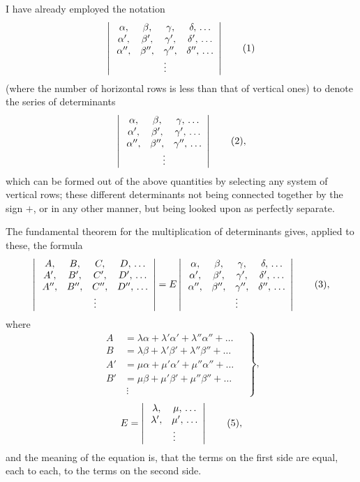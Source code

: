 \documentclass[11pt]{article}
\begin{document}
I have already employed the notation
\[
\left|\,
\begin{array}{cccc}
\alpha, & \beta, & \gamma, & \delta,\,\ldots\\
\alpha', & \beta', & \gamma', & \delta',\,\ldots\\
\alpha'', & \beta'', & \gamma'', & \delta'',\,\ldots\\
\multicolumn{4}{c}{\vdots}
\end{array}
\right| \tag{1}
\]
(where the number of horizontal rows is less than that of vertical ones) to denote
the series of determinants
\[
\left|\,
\begin{array}{ccc}
\alpha, & \beta, & \gamma,\,\ldots\\
\alpha', & \beta', & \gamma',\,\ldots\\
\alpha'', & \beta'', & \gamma'',\,\ldots\\
\multicolumn{3}{c}{\vdots}
\end{array}
\right| \tag{2},
\]
which can be formed out of the above quantities by selecting any system of vertical
rows; these different determinants not being connected together by the sign $+$, or in
any other manner, but being looked upon as perfectly separate.

The fundamental theorem for the multiplication of determinants gives, applied to
these, the formula
\[
\left|\,
\begin{array}{cccc}
A, & B, & C, & D,\,\ldots\\
A', & B', & C', & D',\,\ldots\\
A'', & B'', & C'', & D'',\,\ldots\\
\multicolumn{4}{c}{\vdots}
\end{array}
\right| = E \left|\,
\begin{array}{cccc}
\alpha, & \beta, & \gamma, & \delta,\,\ldots\\
\alpha', & \beta', & \gamma', & \delta',\,\ldots\\
\alpha'', & \beta'', & \gamma'', & \delta'',\,\ldots\\
\multicolumn{4}{c}{\vdots}
\end{array}
\right| \tag{3},
\]
where
\[
\left.
\begin{aligned}
A &= \lambda \alpha + \lambda' \alpha' + \lambda'' \alpha'' + \ldots\\
B &= \lambda \beta + \lambda' \beta' + \lambda'' \beta'' + \ldots\\
A' &= \mu \alpha + \mu' \alpha' + \mu'' \alpha'' + \ldots\\
B' &= \mu \beta + \mu' \beta' + \mu'' \beta'' + \ldots\\
&\ \vdots
\end{aligned}\quad\right\} \tag{4},
\]
\[
E = \left|\,
\begin{array}{cc}
\lambda, & \mu,\,\ldots\\
\lambda', & \mu',\,\ldots\\
\multicolumn{2}{c}{\vdots}
\end{array}
\right| \tag{5},
\]
and the meaning of the equation is, that the terms on the first side are equal, each
to each, to the terms on the second side.
\end{document}
